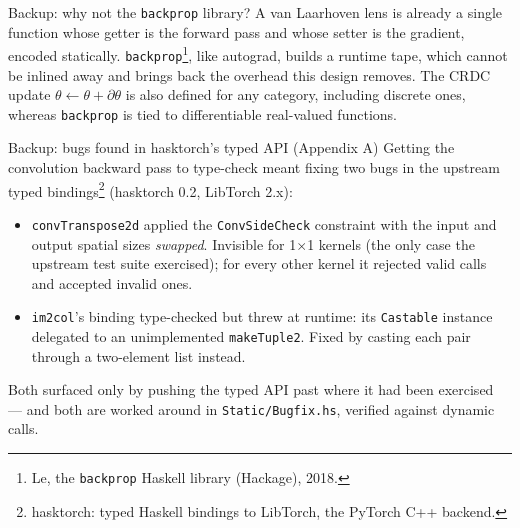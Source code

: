 \documentclass[aspectratio=169,11pt]{beamer}
\begin{document}
\begin{frame}{Backup: why not the \texttt{backprop} library?}
  \small A van Laarhoven lens is already a single function whose getter is the forward pass and whose
  setter is the gradient, encoded statically. \texttt{backprop}\footnote[frame]{Le, the \texttt{backprop} Haskell library (Hackage), 2018.}, like autograd, builds a runtime tape,
  which cannot be inlined away and brings back the overhead this design removes. The CRDC update
  $\theta\!\leftarrow\!\theta+\partial\theta$ is also defined for any category, including discrete ones,
  whereas \texttt{backprop} is tied to differentiable real-valued functions.
\end{frame}

\begin{frame}[fragile]{Backup: bugs found in hasktorch's typed API (Appendix A)}
  \small Getting the convolution backward pass to type-check meant fixing two bugs in the upstream
  typed bindings\footnote[frame]{hasktorch: typed Haskell bindings to LibTorch, the PyTorch C++ backend.} (hasktorch 0.2, LibTorch 2.x):
  \begin{itemize}\footnotesize\setlength\itemsep{0.4em}
    \item \texttt{convTranspose2d} applied the \texttt{ConvSideCheck} constraint with the input and
          output spatial sizes \emph{swapped}. Invisible for 1$\times$1 kernels (the only case the
          upstream test suite exercised); for every other kernel it rejected valid calls and accepted
          invalid ones.
    \item \texttt{im2col}'s binding type-checked but threw at runtime: its \texttt{Castable} instance
          delegated to an unimplemented \texttt{makeTuple2}. Fixed by casting each pair through a
          two-element list instead.
  \end{itemize}
  Both surfaced only by pushing the typed API past where it had been exercised --- and both are worked
  around in \texttt{Static/Bugfix.hs}, verified against dynamic calls.
\end{frame}
\end{document}
